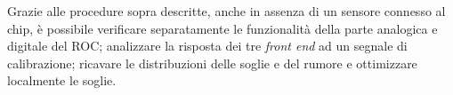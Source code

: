 Grazie alle procedure sopra descritte, anche in assenza di un sensore connesso al chip, \`e possibile verificare separatamente le funzionalità della parte analogica e digitale del ROC; analizzare la risposta dei tre \textit{front end} ad un segnale di calibrazione; ricavare le distribuzioni delle soglie e del rumore e ottimizzare localmente le soglie.





